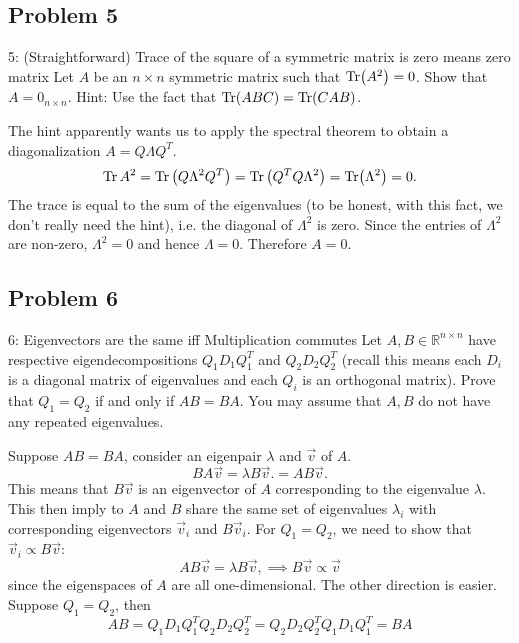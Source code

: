 \documentclass[../main]{subfiles}
\begin{document}
\subsection{Problem 5}
\begin{bbox}{5: (Straightforward) Trace of the square of a symmetric matrix is zero means zero matrix}
    Let $A$ be an $n\times n$ symmetric matrix such that $\Tr(A^2) = 0$. Show that $A = 0_{n\times n}$.
    \newline
    Hint: Use the fact that $\Tr(ABC) = \Tr(CAB)$.
\end{bbox}
\begin{solution}
    The hint apparently wants us to apply the spectral theorem to obtain a diagonalization $A = Q \Lambda Q^T$.
    \[
    \Tr A^2 = \Tr \left(Q\Lambda^2 Q^T\right) = \Tr\left(Q^T Q\Lambda^2\right) =\Tr(\Lambda^2)= 0.
    \]
    The trace is equal to the sum of the eigenvalues (to be honest, with this fact, we don't really need the hint), i.e. the diagonal of $\Lambda^2$ is zero. Since the entries of $\Lambda^2$ are non-zero, $\Lambda^2 = 0$ and hence $\Lambda = 0$. Therefore $A=0$.
\end{solution}
\subsection{Problem 6}
\begin{bbox}{6: Eigenvectors are the same iff Multiplication commutes}
    Let $A,B\in \mathbb R^{n\times n}$ have respective eigendecompositions $Q_1 D_1Q_1^T$ and $Q_2 D_2 Q_2^T$ (recall this means each $D_i$ is a diagonal matrix of eigenvalues and each $Q_i$ is an orthogonal matrix). Prove that $Q_1 = Q_2$ if and only if $AB = BA$. You may assume that $A, B$ do not have any repeated eigenvalues.
\end{bbox}
\begin{solution}
    Suppose $AB = BA$, consider an eigenpair $\lambda$ and $\vec v$ of $A$. 
    \[
    BA \vec v = \lambda B\vec v. = AB\vec v.
    \]
    This means that $B\vec v$ is an eigenvector of $A$ corresponding to the eigenvalue $\lambda$. This then imply to $A$ and $B$ share the same set of eigenvalues $\lambda_i$ with corresponding eigenvectors $\vec v_i$ and $B\vec v_i$. For $Q_1 = Q_2$, we need to show that $\vec v_i \propto B\vec v$: 
    \[
    A B\vec v = \lambda B\vec v, \implies B\vec v \propto \vec v
    \] since the eigenspaces of $A$ are all one-dimensional.
    \newline
    The other direction is easier. Suppose $Q_1 = Q_2$, then 
    \[
    AB = Q_1 D_1 Q_1^T Q_2 D_2 Q_2^T = Q_2 D_2 Q_2^TQ_1 D_1 Q_1^T = BA
    \]
\end{solution}
\end{document}
